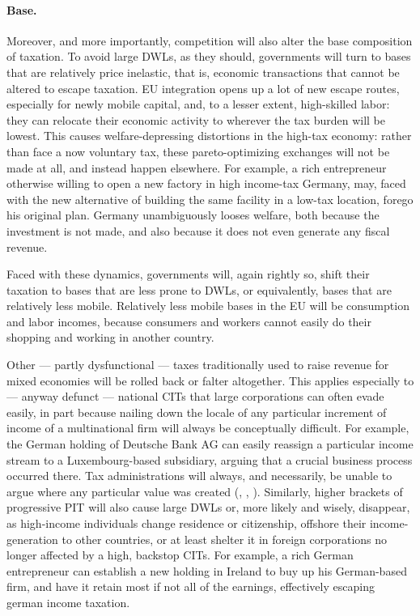 \documentclass[11pt,a4paper,oneside]{article}
\begin{document}

\paragraph{Base.} 
Moreover, and more importantly, competition will also alter the base composition of taxation. 
To avoid large \glspl{DWL}, as they should, governments will turn to bases that are relatively price inelastic, that is, economic transactions that cannot be altered to escape taxation. 
\gls{EU} integration opens up a lot of new escape routes, especially for newly mobile capital, and, to a lesser extent, high-skilled labor: 
they can relocate their economic activity to wherever the tax burden will be lowest. 
This causes welfare-depressing distortions in the high-tax economy: 
rather than face a now voluntary tax, these pareto-optimizing exchanges will not be made at all, and instead happen elsewhere. 
For example, a rich entrepreneur otherwise willing to open a new factory in high income-tax Germany, may, faced with the new alternative of building the same facility in a low-tax location, forego his original plan. 
Germany unambiguously looses welfare, both because the investment is not made, and also because it does not even generate any fiscal revenue.

Faced with these dynamics, governments will, again rightly so, shift their taxation to bases that are less prone to \glspl{DWL}, or equivalently, bases that are relatively less mobile. 
Relatively less mobile bases in the \gls{EU} will be consumption and labor incomes, because consumers and workers cannot easily do their shopping and working in another country. 

Other --- partly dysfunctional --- taxes traditionally used to raise revenue for mixed economies will be rolled back or falter altogether. 
This applies especially to --- anyway defunct --- national \glspl{CIT} that large corporations can often evade easily, in part because nailing down the locale of any particular increment of income of a multinational firm will always be conceptually difficult. 
For example, the German holding of Deutsche Bank AG can easily reassign a particular income stream to a Luxembourg-based subsidiary, arguing that a crucial business process occurred there. 
Tax administrations will always, and necessarily, be unable to argue where any particular value was created (\citealt{Ganghof2006}, \citealt{Ganghof}, \citealt[5]{Ganghof2007}). 
Similarly, higher brackets of progressive \gls{PIT} will also cause large \glspl{DWL} or, more likely and wisely, disappear, as high-income individuals change residence or citizenship, offshore their income-generation to other countries, or at least shelter it in foreign corporations no longer affected by a high, backstop \glspl{CIT}. 
For example, a rich German entrepreneur can establish a new holding in Ireland to buy up his German-based firm, and have it retain most if not all of the earnings, effectively escaping german income taxation. 
\end{document}
